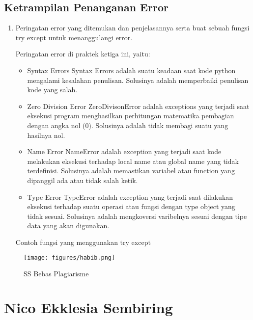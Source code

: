 \subsection{Ketrampilan Penanganan Error}
\begin{enumerate}
	\item Peringatan error yang ditemukan dan penjelasannya serta buat sebuah fungsi try except untuk menanggulangi error.
	
	Peringatan error di praktek ketiga ini, yaitu:
	\begin{itemize}
		\item Syntax Errors
		Syntax Errors adalah suatu keadaan saat kode python mengalami kesalahan penulisan. Solusinya adalah memperbaiki penulisan kode yang salah.
		
		\item Zero Division Error
		ZeroDivisonError adalah exceptions yang terjadi saat eksekusi program menghasilkan perhitungan matematika pembagian dengan angka nol (0). Solusinya adalah tidak membagi suatu yang hasilnya nol.
		
		\item Name Error
		NameError adalah exception yang terjadi saat kode melakukan eksekusi terhadap local name atau global name yang tidak terdefinisi. Solusinya adalah memastikan variabel atau function yang dipanggil ada atau tidak salah ketik.
		
		\item Type Error
		TypeError adalah exception yang terjadi saat dilakukan eksekusi terhadap suatu operasi atau fungsi dengan type object yang tidak sesuai. Solusinya adalah mengkoversi varibelnya sesuai dengan tipe data yang akan digunakan.
	\end{itemize}
	
	Contoh fungsi yang menggunakan try except
	
\end{enumerate}

\begin{figure}[H]
\centering
\texttt{[image: figures/habib.png]}
\caption{SS Bebas Plagiarisme}
\label{habib}
\end{figure}

\section{Nico Ekklesia Sembiring}
